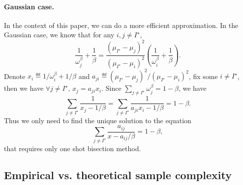 \paragraph{Gaussian case.}
In the context of this paper, we can do a more efficient approximation. In the Gaussian case, we know that for any $i,j\neq I^\star$,
\[
    \frac{1}{\omega_j^\beta} + \frac{1}{\beta} = \frac{(\mu_{I^\star}-\mu_j)^2}{(\mu_{I^\star}-\mu_i)^2}\left(\frac{1}{\omega_i^\beta} + \frac{1}{\beta}\right).
\]
Denote $x_i\eqdef 1/\omega_i^\beta+1/\beta$ and $a_{ji}\eqdef (\mu_{I^\star}-\mu_j)^2/(\mu_{I^\star}-\mu_i)^2$, fix some $i\neq I^\star$, then we have $\forall j\neq I^\star$, $x_j = a_{ji}x_i$. Since $\sum_{j\neq I^\star} \omega_j^\beta = 1-\beta$, we have
\[
    \sum_{j\neq I^\star} \frac{1}{x_j-1/\beta} = \sum_{j\neq I^\star} \frac{1}{a_{ji}x_i-1/\beta} = 1-\beta.
\]
Thus we only need to find the unique solution to the equation
\[
    \sum_{j\neq I^\star} \frac{a_{ij}}{x-a_{ij}/\beta} = 1-\beta,
\]
that requires only one shot bisection method.

\subsection{Empirical vs. theoretical sample complexity}\label{sec:t3c.experiments.illustrations}

